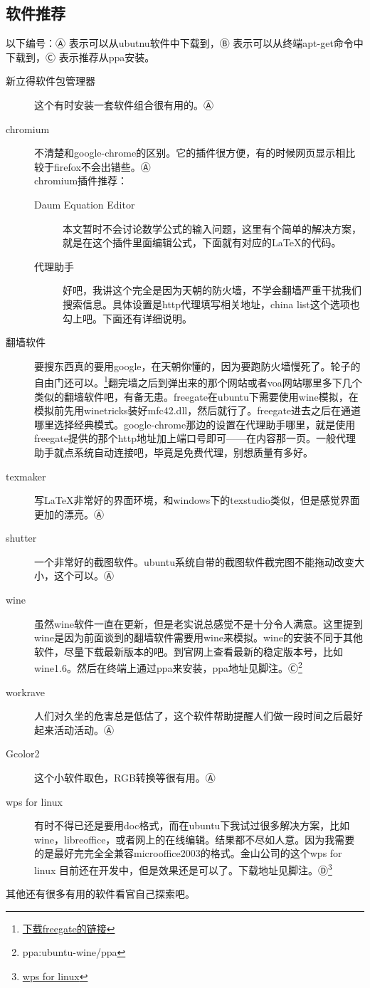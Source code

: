 \documentclass[12pt,oneside]{book}
\begin{document}
\begin{common-format}
\section{软件推荐}
以下编号：Ⓐ 表示可以从ubutnu软件中下载到，Ⓑ 表示可以从终端apt-get命令中下载到，Ⓒ 表示推荐从ppa安装。
\begin{description}
\item[新立得软件包管理器] 这个有时安装一套软件组合很有用的。Ⓐ
\item[chromium] 不清楚和google-chrome的区别。它的插件很方便，有的时候网页显示相比较于firefox不会出错些。Ⓐ\\
chromium插件推荐：
\begin{description}
\item[Daum Equation Editor]  本文暂时不会讨论数学公式的输入问题，这里有个简单的解决方案，就是在这个插件里面编辑公式，下面就有对应的\LaTeX 的代码。
\item[代理助手] 好吧，我讲这个完全是因为天朝的防火墙，不学会翻墙严重干扰我们搜索信息。具体设置是http代理填写相关地址，china list这个选项也勾上吧。下面还有详细说明。
\end{description}
\item[翻墙软件] 要搜东西真的要用google，在天朝你懂的，因为要跑防火墙慢死了。轮子的自由门还可以。\footnote{\href{http://115.com/lb/5lbdvqz2o9i}{下载freegate的链接}}翻完墙之后到弹出来的那个网站或者voa网站哪里多下几个类似的翻墙软件吧，有备无患。freegate在ubuntu下需要使用wine模拟，在模拟前先用winetricks装好mfc42.dll，然后就行了。freegate进去之后在通道哪里选择经典模式。google-chrome那边的设置在代理助手哪里，就是使用freegate提供的那个http地址加上端口号即可——在内容那一页。一般代理助手就点系统自动连接吧，毕竟是免费代理，别想质量有多好。
\item[texmaker] 写\LaTeX 非常好的界面环境，和windows下的texstudio类似，但是感觉界面更加的漂亮。Ⓐ
\item[shutter] 一个非常好的截图软件。ubuntu系统自带的截图软件截完图不能拖动改变大小，这个可以。Ⓐ
\item[wine] 虽然wine软件一直在更新，但是老实说总感觉不是十分令人满意。这里提到wine是因为前面谈到的翻墙软件需要用wine来模拟。wine的安装不同于其他软件，尽量下载最新版本的吧。到官网上查看最新的稳定版本号，比如wine1.6。然后在终端上通过ppa来安装，ppa地址见脚注。Ⓒ\footnote{ppa:ubuntu-wine/ppa}
\item[workrave] 人们对久坐的危害总是低估了，这个软件帮助提醒人们做一段时间之后最好起来活动活动。Ⓐ 
\item[Gcolor2] 这个小软件取色，RGB转换等很有用。Ⓐ
\item[wps for linux] 有时不得已还是要用doc格式，而在ubuntu下我试过很多解决方案，比如wine，libreoffice，或者网上的在线编辑。结果都不尽如人意。因为我需要的是最好完完全全兼容microoffice2003的格式。金山公司的这个wps for linux 目前还在开发中，但是效果还是可以了。下载地址见脚注。Ⓓ\footnote{\href{http://linux.wps.cn/}{wps for linux}}
\end{description} 
其他还有很多有用的软件看官自己探索吧。



\end{common-format}
\end{document}
